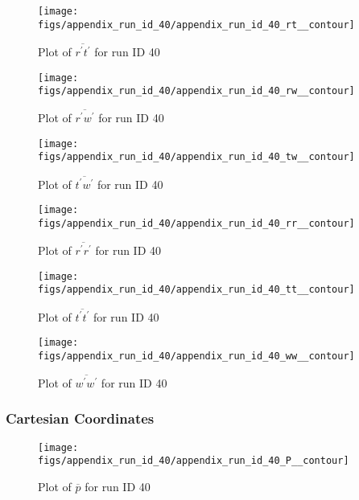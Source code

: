 \begin{figure}[H]
\centering
\texttt{[image: figs/appendix\_run\_id\_40/appendix\_run\_id\_40\_rt\_\_contour]}
\caption{Plot of $\overline{r^\prime t^\prime}$ for run ID 40}
\label{fig:appendix_run_id_40_rt__contour}
\end{figure}


\begin{figure}[H]
\centering
\texttt{[image: figs/appendix\_run\_id\_40/appendix\_run\_id\_40\_rw\_\_contour]}
\caption{Plot of $\overline{r^\prime w^\prime}$ for run ID 40}
\label{fig:appendix_run_id_40_rw__contour}
\end{figure}


\begin{figure}[H]
\centering
\texttt{[image: figs/appendix\_run\_id\_40/appendix\_run\_id\_40\_tw\_\_contour]}
\caption{Plot of $\overline{t^\prime w^\prime}$ for run ID 40}
\label{fig:appendix_run_id_40_tw__contour}
\end{figure}


\begin{figure}[H]
\centering
\texttt{[image: figs/appendix\_run\_id\_40/appendix\_run\_id\_40\_rr\_\_contour]}
\caption{Plot of $\overline{r^\prime r^\prime}$ for run ID 40}
\label{fig:appendix_run_id_40_rr__contour}
\end{figure}


\begin{figure}[H]
\centering
\texttt{[image: figs/appendix\_run\_id\_40/appendix\_run\_id\_40\_tt\_\_contour]}
\caption{Plot of $\overline{t^\prime t^\prime}$ for run ID 40}
\label{fig:appendix_run_id_40_tt__contour}
\end{figure}


\begin{figure}[H]
\centering
\texttt{[image: figs/appendix\_run\_id\_40/appendix\_run\_id\_40\_ww\_\_contour]}
\caption{Plot of $\overline{w^\prime w^\prime}$ for run ID 40}
\label{fig:appendix_run_id_40_ww__contour}
\end{figure}


\subsubsection{Cartesian Coordinates}
\begin{figure}[H]
\centering
\texttt{[image: figs/appendix\_run\_id\_40/appendix\_run\_id\_40\_P\_\_contour]}
\caption{Plot of $\overline{p}$ for run ID 40}
\label{fig:appendix_run_id_40_P__contour}
\end{figure}


